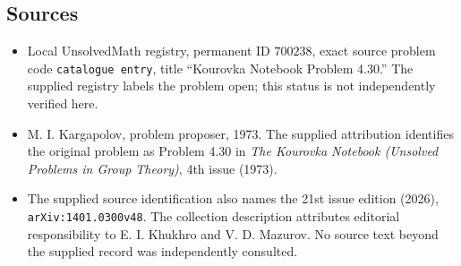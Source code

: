 \documentclass[11pt]{article}
\begin{document}
\subsection{Sources}
\begin{itemize}
\item Local UnsolvedMath registry, permanent ID \(700238\), exact source problem code \texttt{catalogue entry}, title ``Kourovka Notebook Problem 4.30.'' The supplied registry labels the problem open; this status is not independently verified here.
\item M. I. Kargapolov, problem proposer, 1973. The supplied attribution identifies the original problem as Problem 4.30 in \emph{The Kourovka Notebook (Unsolved Problems in Group Theory)}, 4th issue (1973).
\item The supplied source identification also names the 21st issue edition (2026), \texttt{arXiv:1401.0300v48}. The collection description attributes editorial responsibility to E. I. Khukhro and V. D. Mazurov. No source text beyond the supplied record was independently consulted.
\end{itemize}
\end{document}

